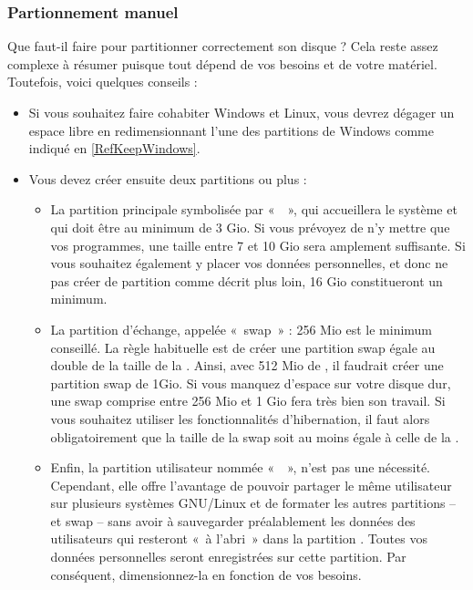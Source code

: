 \subsubsection{Partionnement manuel}
Que faut-il faire pour partitionner correctement son disque ? Cela reste assez complexe à résumer puisque tout dépend de vos besoins et de votre matériel. Toutefois, voici quelques conseils :
\begin{itemize}
\item Si vous souhaitez faire cohabiter Windows et Linux, vous devrez dégager un espace libre en redimensionnant l'une des partitions de Windows comme indiqué en \ref{RefKeepWindows}.
\item Vous devez créer ensuite deux partitions ou plus :
\Partitionnement
\begin{itemize}
\item La partition principale symbolisée par «~\Chemin{/}~», qui accueillera le système et qui doit être au minimum de 3 Gio. Si vous prévoyez de n'y mettre que vos programmes, une taille entre 7 et 10 Gio sera amplement suffisante. Si vous souhaitez également y placer vos données personnelles, et donc ne pas créer de partition  comme décrit plus loin, 16 Gio constitueront un minimum.
\item La partition d'échange, appelée «~swap~» : 256 Mio est le minimum conseillé. La règle habituelle est de créer une partition swap égale au double de la taille de la . Ainsi, avec 512 Mio de , il faudrait créer une partition swap de 1Gio. Si vous manquez d'espace sur votre disque dur, une swap comprise entre 256 Mio et 1 Gio fera très bien son travail. Si vous souhaitez utiliser les fonctionnalités d'hibernation, il faut alors obligatoirement que la taille de la swap soit au moins égale à celle de la .
\item Enfin, la partition utilisateur nommée «~~», n'est pas une nécessité. Cependant, elle offre l'avantage de pouvoir partager le même utilisateur sur plusieurs systèmes GNU/Linux et de formater les autres partitions -- \Chemin{/} et swap -- sans avoir à sauvegarder préalablement les données des utilisateurs qui resteront «~à l'abri~» dans la partition . Toutes vos données personnelles seront enregistrées sur cette partition. Par conséquent, dimensionnez-la en fonction de vos besoins.

\end{itemize}
\end{itemize}
